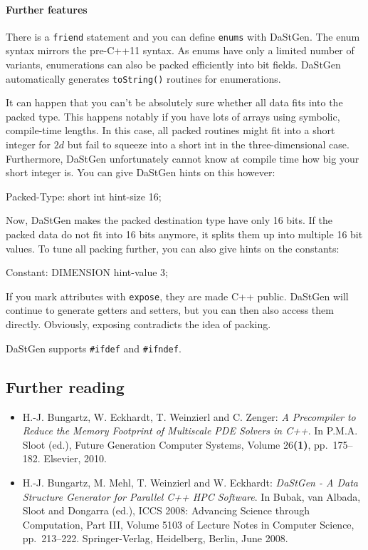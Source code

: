 \paragraph{Further features}

There is a \texttt{friend} statement and you can define \texttt{enums} with
DaStGen. 
The enum syntax mirrors the pre-C++11 syntax.
As enums have only a limited number of variants, enumerations can also be packed
efficiently into bit fields.
DaStGen automatically generates \texttt{toString()} routines for enumerations.


It can happen that you can't be absolutely sure whether all data fits into the
packed type.
This happens notably if you have lots of arrays using symbolic, compile-time
lengths.
In this case, all packed routines might fit into a short integer for $2d$ but
fail to squeeze into a short int in the three-dimensional case. 
Furthermore, DaStGen unfortunately cannot know at compile time how big your
short integer is.
You can give DaStGen hints on this however:
\begin{code}
  Packed-Type: short int hint-size 16;
\end{code} 

\noindent
Now, DaStGen makes the packed destination type have only 16 bits. If the packed
data do not fit into 16 bits anymore, it splits them up into multiple 16 bit
values.
To tune all packing further, you can also give hints on the constants:
\begin{code}
 Constant: DIMENSION hint-value 3;
\end{code} 


If you mark attributes with \texttt{expose}, they are made C++ public.
DaStGen will continue to generate getters and setters, but you can then also
access them directly.
Obviously, exposing contradicts the idea of packing.


DaStGen supports \texttt{\#ifdef} and \texttt{\#ifndef}. 



\subsection*{Further reading}

\begin{itemize}
  \item H.-J. Bungartz, W. Eckhardt, T. Weinzierl and C. Zenger: {\em A Precompiler to
Reduce the Memory Footprint of Multiscale PDE Solvers in C++}.
In P.M.A. Sloot (ed.), Future Generation Computer Systems, Volume
26\textbf{(1)}, pp.~175--182. Elsevier, 2010.
  \item H.-J. Bungartz, M. Mehl, T. Weinzierl and W. Eckhardt: {\em DaStGen - A Data
Structure Generator for Parallel C++ HPC Software}.
In Bubak, van Albada, Sloot and Dongarra (ed.), ICCS 2008: Advancing Science
through Computation, Part III, Volume 5103 of Lecture Notes in Computer Science,
pp.~213--222. Springer-Verlag, Heidelberg, Berlin, June 2008.
\end{itemize}
